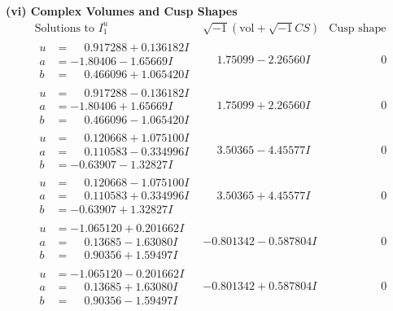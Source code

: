 \documentclass[1p]{elsarticle_modified}
\theoremstyle{definition}
\newcommand{\I}{\sqrt{-1}}
\begin{document}
\newpage\flushleft \textbf{(vi) Complex Volumes and Cusp Shapes}
$$\begin{array}{c|c|c}  
\text{Solutions to }I^u_{1}& \I (\text{vol} + \sqrt{-1}CS) & \text{Cusp shape}\\
 \hline 
\begin{aligned}
u &= \phantom{-}0.917288 + 0.136182 I \\
a &= -1.80406 - 1.65669 I \\
b &= \phantom{-}0.466096 + 1.065420 I\end{aligned}
 & \phantom{-}1.75099 - 2.26560 I & \phantom{-0.000000 } 0 \\ \hline\begin{aligned}
u &= \phantom{-}0.917288 - 0.136182 I \\
a &= -1.80406 + 1.65669 I \\
b &= \phantom{-}0.466096 - 1.065420 I\end{aligned}
 & \phantom{-}1.75099 + 2.26560 I & \phantom{-0.000000 } 0 \\ \hline\begin{aligned}
u &= \phantom{-}0.120668 + 1.075100 I \\
a &= \phantom{-}0.110583 - 0.334996 I \\
b &= -0.63907 - 1.32827 I\end{aligned}
 & \phantom{-}3.50365 - 4.45577 I & \phantom{-0.000000 } 0 \\ \hline\begin{aligned}
u &= \phantom{-}0.120668 - 1.075100 I \\
a &= \phantom{-}0.110583 + 0.334996 I \\
b &= -0.63907 + 1.32827 I\end{aligned}
 & \phantom{-}3.50365 + 4.45577 I & \phantom{-0.000000 } 0 \\ \hline\begin{aligned}
u &= -1.065120 + 0.201662 I \\
a &= \phantom{-}0.13685 - 1.63080 I \\
b &= \phantom{-}0.90356 + 1.59497 I\end{aligned}
 & -0.801342 - 0.587804 I & \phantom{-0.000000 } 0 \\ \hline\begin{aligned}
u &= -1.065120 - 0.201662 I \\
a &= \phantom{-}0.13685 + 1.63080 I \\
b &= \phantom{-}0.90356 - 1.59497 I\end{aligned}
 & -0.801342 + 0.587804 I & \phantom{-0.000000 } 0 \\ \hline\begin{aligned}

\end{aligned}
\end{array}$$
\end{document}
